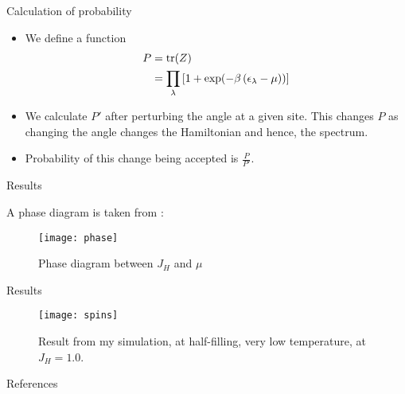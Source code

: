 \documentclass[]{beamer}
\begin{document}
\begin{frame}{Calculation of probability}
\begin{itemize}
	\item We define a function
	\begin{align}
	\nonumber
	P &= \tr(Z)\\
	&= \prod\limits_{\lambda}\left[1 + \exp(-\beta \left( \epsilon_\lambda - \mu \right))\right]
	\end{align}
	\item We calculate $ P' $ after perturbing the angle at a given site. This changes $ P $ as changing the angle changes the Hamiltonian and hence, the spectrum.
	\item Probability of this change being accepted is $ \frac{P}{P'} $.
\end{itemize}
\end{frame}

\begin{frame}{Results}

A phase diagram is taken from \cite{PhysRevLett.80.845}:
	\begin{figure}[h!]
		\centering
		\texttt{[image: phase]}
		\caption{Phase diagram between $ J_H $ and $ \mu $}
		\label{fig:phase}
	\end{figure}
	
\end{frame}

\begin{frame}{Results}
\begin{figure}[h!]
	\centering
	\texttt{[image: spins]}
	\caption{Result from my simulation, at half-filling, very low temperature, at $ J_H = 1.0 $.}
	\label{fig:spins}
\end{figure}

\end{frame}


\begin{frame}{References}
\nocite{*}
{}

\end{frame}
\end{document}
